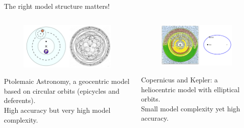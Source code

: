\documentclass[aspectratio=169]{../latex_main/tntbeamer}  %
\begin{document}
	\begin{frame}{The right model structure matters!}
	    \begin{columns}
	        \begin{column}{.5\textwidth}
	                \begin{figure}
	                    \includegraphics[scale=.35]{Bild15}
	                \end{figure}
	                Ptolemaic Astronomy, a geocentric model based on circular orbits (epicycles and deferents).\\
	                \bigskip
	                High accuracy but very high model complexity.
	        \end{column}
	        
	        
	        \begin{column}{.5\textwidth}
	                \begin{figure}
	                    \includegraphics[scale=.35]{Bild16}
	                \end{figure}
	                Copernicus and Kepler: a heliocentric model with elliptical orbits.\\
	                \bigskip
	                Small model complexity yet high accuracy.

	        \end{column}
	    \end{columns}
	\end{frame}
\end{document}
